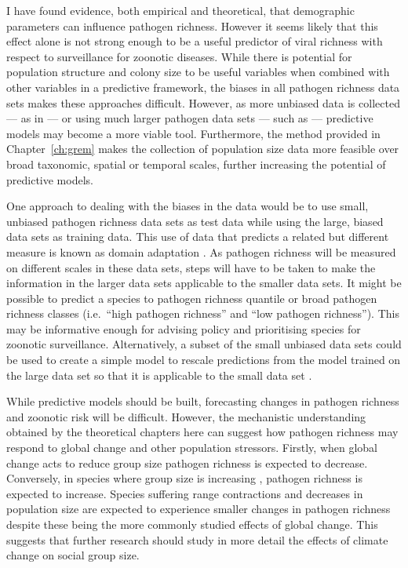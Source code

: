 I have found evidence, both empirical and theoretical, that demographic parameters can influence pathogen richness.
However it seems likely that this effect alone is not strong enough to be a useful predictor of viral richness with respect to surveillance for zoonotic diseases.
While there is potential for population structure and colony size to be useful variables when combined with other variables in a predictive framework, the biases in all pathogen richness data sets makes these approaches difficult.
However, as more unbiased data is collected --- as in \textcite{anthony2013strategy, anthony2015non} --- or using much larger pathogen data sets --- such as \textcite{wardeh2015database} --- predictive models may become a more viable tool.
Furthermore, the method provided in Chapter~\ref{ch:grem} makes the collection of population size data more feasible over broad taxonomic, spatial or temporal scales, further increasing the potential of predictive models.

One approach to dealing with the biases in the data would be to use small, unbiased pathogen richness data sets as test data while using the large, biased data sets as training data.
This use of data that predicts a related but different measure is known as domain adaptation \cite{daume2006domain, daume2009frustratingly}.
As pathogen richness will be measured on different scales in these data sets, steps will have to be taken to make the information in the larger data sets applicable to the smaller data sets.
It might be possible to predict a species to pathogen richness quantile or broad pathogen richness classes (i.e.\ ``high pathogen richness'' and ``low pathogen richness'').
This may be informative enough for advising policy and prioritising species for zoonotic surveillance.
Alternatively, a subset of the small unbiased data sets could be used to create a simple model to rescale predictions from the model trained on the large data set so that it is applicable to the small data set \cite{daume2009frustratingly}.

While predictive models should be built, forecasting changes in pathogen richness and zoonotic risk will be difficult.
However, the mechanistic understanding obtained by the theoretical chapters here can suggest how pathogen richness may respond to global change and other population stressors.
Firstly, when global change acts to reduce group size \cite{lehmann2010apes, zunino2007habitat, manor2003impact, atwood2006influence} pathogen richness is expected to decrease.
Conversely, in species where group size is increasing \cite{lehmann2010apes}, pathogen richness is expected to increase.
Species suffering range contractions \cite{thomas2004extinction} and decreases in population size \cite{craigie2010large} are expected to experience smaller changes in pathogen richness despite these being the more commonly studied effects of global change.
This suggests that further research should study in more detail the effects of climate change on social group size.

